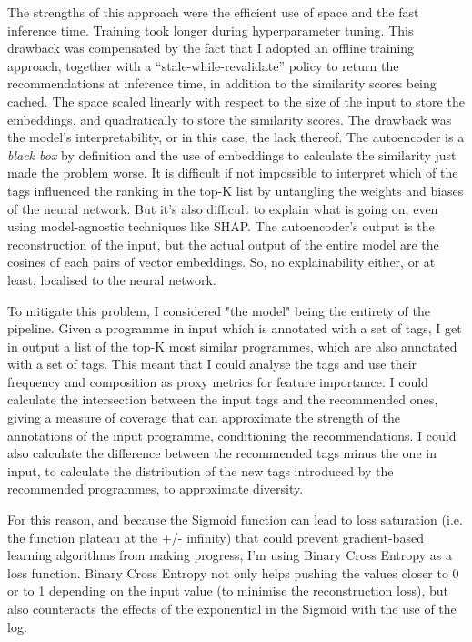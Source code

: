 The strengths of this approach were the efficient use of space and the fast inference time. Training took longer during hyperparameter tuning.
This drawback was compensated by the fact that I adopted an offline training approach,
together with a ``stale-while-revalidate'' policy to return the recommendations at inference time, in addition to the similarity scores being cached.
The space scaled linearly with respect to the size of the input to store the embeddings, and quadratically to store the similarity scores.
The drawback was the model's interpretability, or in this case, the lack thereof. The autoencoder is a \textit{black box} by definition and the
use of embeddings to calculate the similarity just made the problem worse. It is difficult if not impossible to interpret which of the tags influenced
the ranking in the top-K list by untangling the weights and biases of the neural network. But it's also difficult to explain what is going on,
even using model-agnostic techniques like SHAP. The autoencoder's output is the reconstruction of the input, but the actual output of the entire model
are the cosines of each pairs of vector embeddings. So, no explainability either, or at least, localised to the neural network.

To mitigate this problem, I considered "the model" being the entirety of the pipeline. Given a programme in input which is annotated with a set of tags,
I get in output a list of the top-K most similar programmes, which are also annotated with a set of tags. This meant that I could analyse the tags
and use their frequency and composition as proxy metrics for feature importance. I could calculate the intersection between the input tags and the
recommended ones, giving a measure of coverage that can approximate the strength of the annotations of the input programme, conditioning the recommendations.
I could also calculate the difference between the recommended tags minus the one in input, to calculate the distribution of the new tags introduced by
the recommended programmes, to approximate diversity.








For this reason, and because the Sigmoid function can lead to loss saturation (i.e. the function plateau at the +/- infinity) that could prevent gradient-based learning algorithms from making progress, I'm using Binary Cross Entropy as a loss function. Binary Cross Entropy not only helps pushing the values closer to 0 or to 1 depending on the input value (to minimise the reconstruction loss), but also counteracts the effects of the exponential in the Sigmoid with the use of the log.
